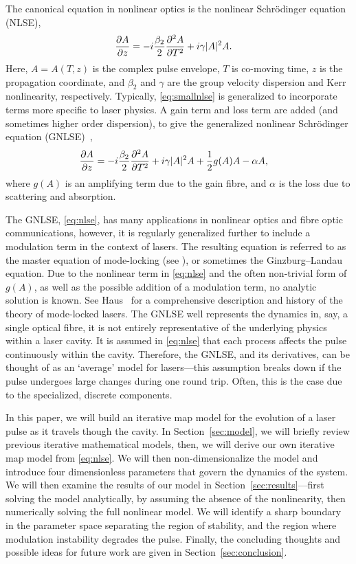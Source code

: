 \documentclass[9pt,twocolumn,twoside]{osajnl}
\newcommand{\pdiff}[3][\hspace{-0.5pt}]{\frac{\partial^{#1}#2}{\partial{#3}^{#1}}} %
\begin{document}
The canonical equation in nonlinear optics is the nonlinear Schr\"odinger equation (NLSE),
\begin{align}
	\pdiff{A}{z} &= - i \frac{\beta_2}{2}\pdiff[2]{A}{T} + i \gamma |A|^2 A.
	\label{eq:smallnlse}
\end{align}
Here, $A = A(T, z)$ is the complex pulse envelope, $T$ is co-moving time, $z$ is the propagation coordinate, and $\beta_2$ and $\gamma$ are the group velocity dispersion and Kerr nonlinearity, respectively. Typically, \eqref{eq:smallnlse} is generalized to incorporate terms more specific to laser physics. A gain term and loss term are added (and sometimes higher order dispersion), to give the generalized nonlinear Schr\"odinger equation (GNLSE)~\cite{agrawal2013, bohun2015, finot2008, peng2018, shtyrina2017, yarutkina2013},
	\begin{align}
	\pdiff{A}{z} &= - i \frac{\beta_2}{2}\pdiff[2]{A}{T} + i \gamma |A|^2 A + \frac{1}{2}g(A) A - \alpha A,
	\label{eq:nlse}
\end{align}
where $g(A)$ is an amplifying term due to the gain fibre, and $\alpha$ is the loss due to scattering and absorption.

The GNLSE, \eqref{eq:nlse}, has many applications in nonlinear optics and fibre optic communications, however, it is regularly generalized further to include a modulation term in the context of lasers. The resulting equation is referred to as the master equation of mode-locking (see \cite{haus1975, haus1984, haus2000, tamura1996, usechak2005}), or sometimes the Ginzburg--Landau equation. Due to the nonlinear term in \eqref{eq:nlse} and the often non-trivial form of $g(A)$, as well as the possible addition of a modulation term, no analytic solution is known. See Haus~\cite{haus2000} for a comprehensive description and history of the theory of mode-locked lasers. The GNLSE well represents the dynamics in, say, a single optical fibre, it is not entirely representative of the underlying physics within a laser cavity. It is assumed in \eqref{eq:nlse} that each process affects the pulse continuously within the cavity. Therefore, the GNLSE, and its derivatives, can be thought of as an `average' model for lasers---this assumption breaks down if the pulse undergoes large changes during one round trip. Often, this is the case due to the specialized, discrete components.

In this paper, we will build an iterative map model for the evolution of a laser pulse as it travels though the cavity. In Section~\ref{sec:model}, we will briefly review previous iterative mathematical models, then, we will derive our own iterative map model from \eqref{eq:nlse}. We will then non-dimensionalize the model and introduce four dimensionless parameters that govern the dynamics of the system. We will then examine the results of our model in Section~\ref{sec:results}---first solving the model analytically, by assuming the absence of the nonlinearity, then numerically solving the full nonlinear model. We will identify a sharp boundary in the parameter space separating the region of stability, and the region where modulation instability degrades the pulse. Finally, the concluding thoughts and possible ideas for future work are given in Section~\ref{sec:conclusion}.
\end{document}
